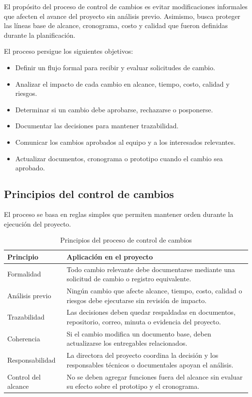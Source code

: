 \documentclass[11pt,spanish]{article}
\begin{document}
El propósito del proceso de control de cambios es evitar modificaciones informales que afecten el avance del proyecto sin análisis previo. Asimismo, busca proteger las líneas base de alcance, cronograma, costo y calidad que fueron definidas durante la planificación.

El proceso persigue los siguientes objetivos:

\begin{itemize}[leftmargin=*, label={\textbullet}]
    \item Definir un flujo formal para recibir y evaluar solicitudes de cambio.
    \item Analizar el impacto de cada cambio en alcance, tiempo, costo, calidad y riesgos.
    \item Determinar si un cambio debe aprobarse, rechazarse o posponerse.
    \item Documentar las decisiones para mantener trazabilidad.
    \item Comunicar los cambios aprobados al equipo y a los interesados relevantes.
    \item Actualizar documentos, cronograma o prototipo cuando el cambio sea aprobado.
\end{itemize}

\subsection{Principios del control de cambios}

El proceso se basa en reglas simples que permiten mantener orden durante la ejecución del proyecto.

\begin{table}[H]
\centering
\caption{Principios del proceso de control de cambios}
\label{tab:principios-cambios}
{\small
\begin{tabularx}{\textwidth}{p{4cm} Y}
\toprule
\textbf{Principio} & \textbf{Aplicación en el proyecto} \\
\midrule
Formalidad & Todo cambio relevante debe documentarse mediante una solicitud de cambio o registro equivalente. \\
Análisis previo & Ningún cambio que afecte alcance, tiempo, costo, calidad o riesgos debe ejecutarse sin revisión de impacto. \\
Trazabilidad & Las decisiones deben quedar respaldadas en documentos, repositorio, correo, minuta o evidencia del proyecto. \\
Coherencia & Si el cambio modifica un documento base, deben actualizarse los entregables relacionados. \\
Responsabilidad & La directora del proyecto coordina la decisión y los responsables técnicos o documentales apoyan el análisis. \\
Control del alcance & No se deben agregar funciones fuera del alcance sin evaluar su efecto sobre el prototipo y el cronograma. \\
\bottomrule
\end{tabularx}
}
\end{table}
\end{document}
